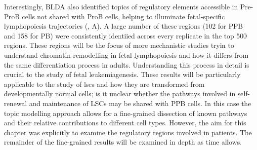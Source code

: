 Interestingly, BLDA also identified topics of regulatory elements accessible in Pre-ProB cells not shared with ProB cells, helping to illuminate fetal-specific lymphopoiesis trajectories (, A). A large number of these regions (102 for PPB and 158 for PB) were consistently identiied across every replicate in the top 500 regions. These regions will be the focus of more mechanistic studies tryin to understand chromatin remodelling in fetal lymphopoiesis and how it differs from the same differentiation process in adults. Understanding this process in detail is crucial to the study of fetal leukemiagenesis. These results will be particularly applicable to the study of \glspl{lsc} and how they are transformed from developmentally normal cells; is it unclear whether the pathways involved in self-renewal and maintenance of LSCs may be shared with PPB cells. In this case the topic modelling approach allows for a fine-grained dissection of known pathways and their relative contributions to different cell types. However, the aim for this chapter was explicitly to examine the regulatory regions involved in patients. The remainder of the fine-grained results will be examined in depth as time allows. 

